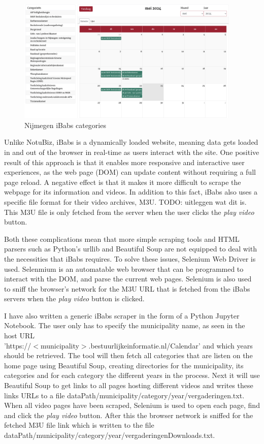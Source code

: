\documentclass[twoside]{uva-inf-bachelor-thesis}
\begin{document}
\begin{figure}
    \centering
    \includegraphics[width=0.95\textwidth]{images/ibabsCats.png}
    \caption{Nijmegen iBabs categories}
    \label{fig:ibabsCats}
\end{figure}

Unlike NotuBiz, iBabs is a dynamically loaded website, meaning data gets loaded in and out of the browser in real-time as users interact with the site. One positive result of this approach is that it enables more responsive and interactive user experiences, as the web page (DOM) can update content without requiring a full page reload. A negative effect is that it makes it more difficult to scrape the webpage for its information and videos.
In addition to this fact, iBabs also uses a specific file format for their video archives, M3U. TODO: uitleggen wat dit is. This M3U file is only fetched from the server when the user clicks the \textit{play video} button. 

Both these complications mean that more simple scraping tools and HTML parsers such as Python's urllib and Beautiful Soup are not equipped to deal with the necessities that iBabs requires. To solve these issues, Selenium Web Driver is used. Selenmium is an automatable web browser that can be programmed to interact with the DOM, and parse the current web pages. Selenium is also used to sniff the browser's network for the M3U URL that is fetched from the iBabs servers when the \textit{play video} button is clicked. 

I have also written a generic iBabs scraper in the form of a Python Jupyter Notebook. The user only has to specify the municipality name, as seen in the host URL \\ 'https://$<$municipality$>$.bestuurlijkeinformatie.nl/Calendar' and which years should be retrieved. The tool will then fetch all categories that are listen on the home page using Beautiful Soup, creating directories for the municipality, its categories and for each category the different years in the process. 
Next it will use Beautiful Soup to get links to all pages hosting different videos and writes these links URLs to a file dataPath/municipality/category/year/vergaderingen.txt. 
When all video pages have been scraped, Selenium is used to open each page, find and click the \textit{play video} button. After this the browser network is sniffed for the fetched M3U file link which is written to the file dataPath/municipality/category/year/vergaderingenDownloads.txt.
\end{document}

